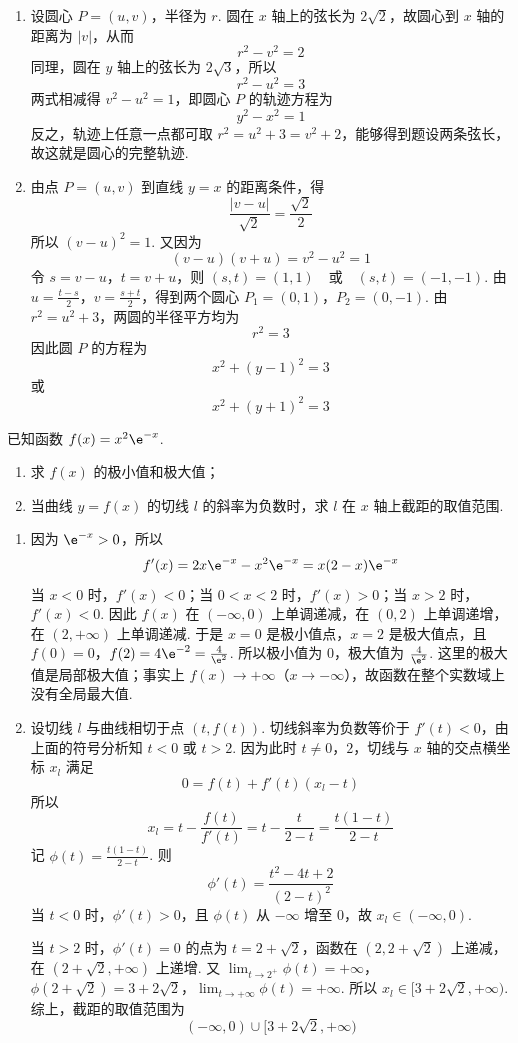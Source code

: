 \begin{solution}
\begin{enumerate}
\item 设圆心 \(P=(u,v)\)，半径为 \(r\). 圆在 \(x\) 轴上的弦长为 \(2\sqrt{2}\)，故圆心到 \(x\) 轴的距离为 \(|v|\)，从而
\[
r^2-v^2=2
\]
同理，圆在 \(y\) 轴上的弦长为 \(2\sqrt{3}\)，所以
\[
r^2-u^2=3
\]
两式相减得 \(v^2-u^2=1\)，即圆心 \(P\) 的轨迹方程为
\[
y^2-x^2=1
\]
反之，轨迹上任意一点都可取 \(r^2=u^2+3=v^2+2\)，能够得到题设两条弦长，故这就是圆心的完整轨迹.
\item 由点 \(P=(u,v)\) 到直线 \(y=x\) 的距离条件，得
\[
\frac{|v-u|}{\sqrt{2}}=\frac{\sqrt{2}}{2}
\]
所以 \((v-u)^2=1\). 又因为
\[
(v-u)(v+u)=v^2-u^2=1
\]
令 \(s=v-u\)，\(t=v+u\)，则 \((s,t)=(1,1)\quad\text{或}\quad(s,t)=(-1,-1)\).
由 \(u=\frac{t-s}{2}\)，\(v=\frac{s+t}{2}\)，得到两个圆心 \(P_1=(0,1)\)，\(P_2=(0,-1)\).
由 \(r^2=u^2+3\)，两圆的半径平方均为
\[
r^2=3
\]
因此圆 \(P\) 的方程为
\[
x^2+(y-1)^2=3
\]
或
\[
x^2+(y+1)^2=3
\]
\end{enumerate}
\end{solution}

\begin{problem}
已知函数 \( f(x) = x^{2}\e^{-x} \).
\begin{enumerate}
\item 求 \( f(x) \) 的极小值和极大值；
\item 当曲线 \( y = f(x) \) 的切线 \( l \) 的斜率为负数时，求 \( l \) 在 \( x \) 轴上截距的取值范围.
\end{enumerate}
\end{problem}

\begin{solution}
\begin{enumerate}
\item 因为 \(\e^{-x}>0\)，所以
\[
f'(x)=2x\e^{-x}-x^2\e^{-x}=x(2-x)\e^{-x}
\]
当 \(x<0\) 时，\(f'(x)<0\)；当 \(0<x<2\) 时，\(f'(x)>0\)；当 \(x>2\) 时，\(f'(x)<0\). 因此 \(f(x)\) 在 \((-\infty,0)\) 上单调递减，在 \((0,2)\) 上单调递增，在 \((2,+\infty)\) 上单调递减. 于是 \(x=0\) 是极小值点，\(x=2\) 是极大值点，且
\(f(0)=0\)，\(f(2)=4\e^{-2}=\frac{4}{\e^2}\).
所以极小值为 \(0\)，极大值为 \(\frac{4}{\e^2}\). 这里的极大值是局部极大值；事实上 \(f(x)\to+\infty\)（\(x\to-\infty\)），故函数在整个实数域上没有全局最大值.
\item 设切线 \(l\) 与曲线相切于点 \(\left(t,f(t)\right)\). 切线斜率为负数等价于 \(f'(t)<0\)，由上面的符号分析知 \(t<0\) 或 \(t>2\). 因为此时 \(t\ne0\)，\(2\)，切线与 \(x\) 轴的交点横坐标 \(x_l\) 满足
\[
0=f(t)+f'(t)(x_l-t)
\]
所以
\[
x_l=t-\frac{f(t)}{f'(t)}=t-\frac{t}{2-t}=\frac{t(1-t)}{2-t}
\]
记 \(\phi(t)=\frac{t(1-t)}{2-t}\). 则
\[
\phi'(t)=\frac{t^2-4t+2}{(2-t)^2}
\]
当 \(t<0\) 时，\(\phi'(t)>0\)，且 \(\phi(t)\) 从 \(-\infty\) 增至 \(0\)，故 \(x_l\in(-\infty,0)\).

当 \(t>2\) 时，\(\phi'(t)=0\) 的点为 \(t=2+\sqrt{2}\)，函数在 \((2,2+\sqrt{2})\) 上递减，在 \((2+\sqrt{2},+\infty)\) 上递增. 又 \(\lim_{t\to2^+}\phi(t)=+\infty\)，\(\phi(2+\sqrt{2})=3+2\sqrt{2}\)，\(\lim_{t\to+\infty}\phi(t)=+\infty\).
所以 \(x_l\in[3+2\sqrt{2},+\infty)\). 综上，截距的取值范围为
\[
(-\infty,0)\cup[3+2\sqrt{2},+\infty)
\]
\end{enumerate}
\end{solution}

